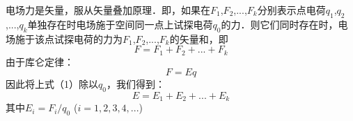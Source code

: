 电场力是矢量，服从矢量叠加原理．即，如果在$F_1$,$F_2$,...,$F_k$分别表示点电荷$q_1$,$q_2$,...,$q_k$单独存在时电场施于空间同一点上试探电荷$q_0$的力．则它们同时存在时，电场施于该点试探电荷的力为$F_1$,$F_2$,...,$F_k$的矢量和，即
\begin{equation}
F = F_1 +F_2 +...+F_k
\end{equation}
由于库仑定律：
\begin{equation}
  F = Eq
\end{equation}
因此将上式（1）除以$q_0$，我们得到： 
\begin{equation}
E = E_1 + E_2 + ... +E_k
\end{equation}
其中$E_i = F_i/q_0$      ($i=1, 2, 3, 4, ...$)